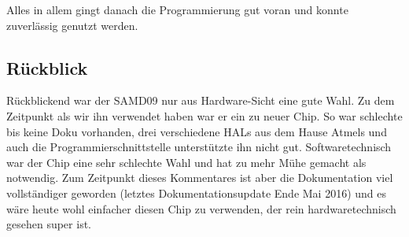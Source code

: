 Alles in allem gingt danach die Programmierung gut voran und konnte zuverl\"assig genutzt werden.

\subsection{R\"uckblick}

R\"uckblickend war der SAMD09 nur aus Hardware-Sicht eine gute Wahl. Zu dem Zeitpunkt als wir ihn verwendet haben war er ein zu neuer Chip. So war schlechte bis keine Doku vorhanden, drei verschiedene HALs aus dem Hause Atmels und auch die Programmierschnittstelle unterst\"utzte ihn nicht gut. Softwaretechnisch war der Chip eine sehr schlechte Wahl und hat zu mehr M\"uhe gemacht als notwendig. Zum Zeitpunkt dieses Kommentares ist aber die Dokumentation viel vollst\"andiger geworden (letztes Dokumentationsupdate Ende Mai 2016) und es w\"are heute wohl einfacher diesen Chip zu verwenden, der rein hardwaretechnisch gesehen super ist.
